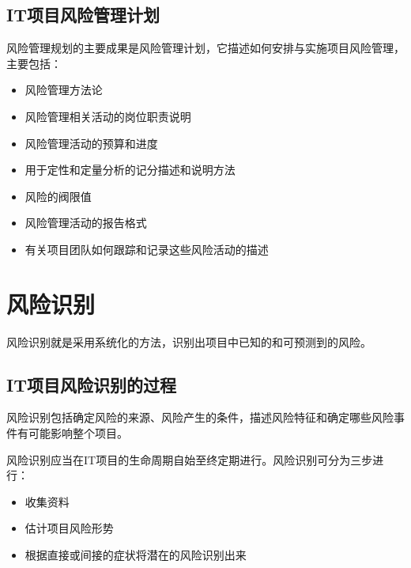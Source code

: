 \subsection{IT项目风险管理计划}
风险管理规划的主要成果是风险管理计划，它描述如何安排与实施项目风险管理，主要包括：
\begin{itemize}
	\item 风险管理方法论
	\item 风险管理相关活动的岗位职责说明
	\item 风险管理活动的预算和进度
	\item 用于定性和定量分析的记分描述和说明方法
	\item 风险的阀限值
	\item 风险管理活动的报告格式
	\item 有关项目团队如何跟踪和记录这些风险活动的描述
\end{itemize}
\section{风险识别}
风险识别就是采用系统化的方法，识别出项目中已知的和可预测到的风险。
\subsection{IT项目风险识别的过程}
 风险识别包括确定风险的来源、风险产生的条件，描述风险特征和确定哪些风险事件有可能影响整个项目。
\par  风险识别应当在IT项目的生命周期自始至终定期进行。风险识别可分为三步进行：
\begin{itemize}
	\item 收集资料
	\item 估计项目风险形势
	\item 根据直接或间接的症状将潜在的风险识别出来
\end{itemize}
